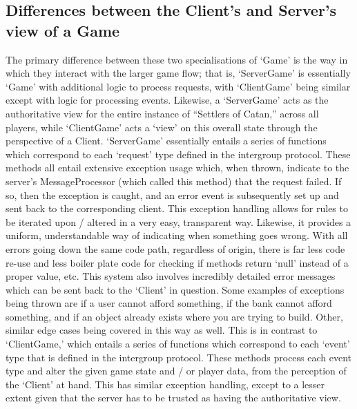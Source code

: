 \documentclass[a4paper,doc,draftfirst]{apa6}
\begin{document}
\subsection{Differences between the Client's and Server's view of a Game}
The primary difference between these two specialisations of ‘Game’ is the way in which they interact with the larger game flow; that is, ‘ServerGame’ is essentially ‘Game’ with additional logic to process requests, with ‘ClientGame’ being similar except with logic for processing events. Likewise, a ‘ServerGame’ acts as the authoritative view for the entire instance of “Settlers of Catan,” across all players, while ‘ClientGame’ acts a ‘view’ on this overall state through the perspective of a Client. ‘ServerGame’ essentially entails a series of functions which correspond to each ‘request’ type defined in the intergroup protocol. These methods all entail extensive exception usage which, when thrown, indicate to the server’s MessageProcessor (which called this method) that the request failed. If so, then the exception is caught, and an error event is subsequently set up and sent back to the corresponding client. This exception handling allows for rules to be iterated upon / altered in a very easy, transparent way. Likewise, it provides a uniform, understandable way of indicating when something goes wrong. With all errors going down the same code path, regardless of origin, there is far less code re-use and less boiler plate code for checking if methods return ‘null’ instead of a proper value, etc. This system also involves incredibly detailed error messages which can be sent back to the ‘Client’  in question. Some examples of exceptions being thrown are if a user cannot afford something, if the bank cannot afford something, and if an object already exists where you are trying to build. Other, similar edge cases being covered in this way as well. This is in contrast to ‘ClientGame,’ which entails a series of functions which correspond to each ‘event’ type that is defined in the intergroup protocol. These methods process each event type and alter the given game state and / or player data, from the perception of the ‘Client’ at hand. This has similar exception handling, except to a lesser extent given that the server has to be trusted as having the authoritative view.
\end{document}
